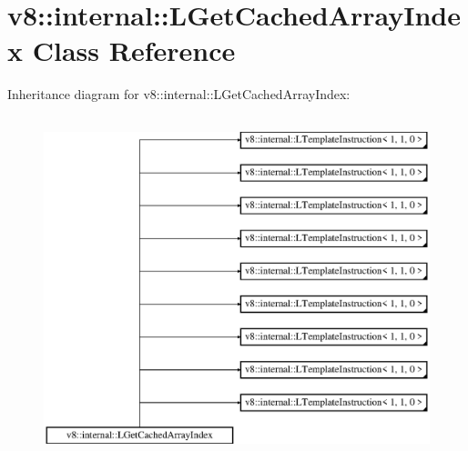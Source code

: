 \hypertarget{classv8_1_1internal_1_1_l_get_cached_array_index}{}\section{v8\+:\+:internal\+:\+:L\+Get\+Cached\+Array\+Index Class Reference}
\label{classv8_1_1internal_1_1_l_get_cached_array_index}
Inheritance diagram for v8\+:\+:internal\+:\+:L\+Get\+Cached\+Array\+Index\+:\begin{figure}[H]
\begin{center}
\leavevmode
\includegraphics[height=10.000000cm]{classv8_1_1internal_1_1_l_get_cached_array_index}
\end{center}
\end{figure}
